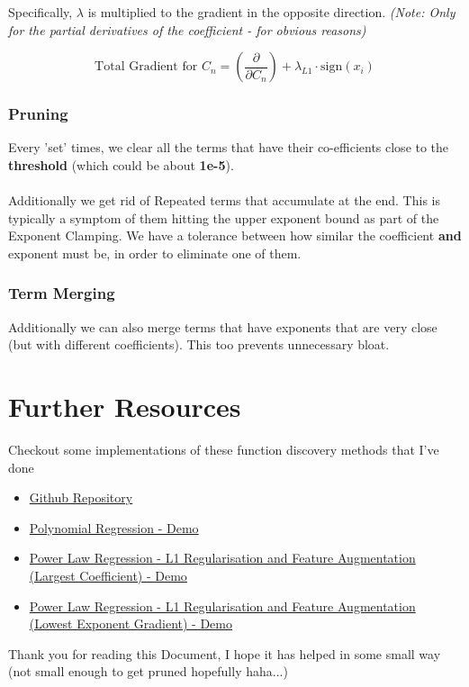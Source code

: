 \documentclass[11pt]{article}
\begin{document}
Specifically, \(\lambda\) is multiplied to the gradient in the opposite direction. \textit{(Note: Only for the partial derivatives of the coefficient - for obvious reasons)}

\[
\text{Total Gradient for } C_n  = \left( \frac{\partial}{\partial C_n} \right) + \lambda_{L1} \cdot \text{sign}(x_i)
\]

\subsubsection{Pruning}

Every 'set' times, we clear all the terms that have their co-efficients close to the \textbf{threshold} (which could be about \textbf{1e-5}). \\\\Additionally we get rid of Repeated terms that accumulate at the end. This is typically a symptom of them hitting the upper exponent bound as part of the Exponent Clamping. We have a tolerance between how similar the coefficient \textbf{and} exponent must be, in order to eliminate one of them.

\subsubsection{Term Merging}
Additionally we can also merge terms that have exponents that are very close (but with different coefficients). This too prevents unnecessary bloat.

\section{Further Resources}
Checkout some implementations of these function discovery methods that I've done
\begin{itemize}
    \item \href{https://github.com/GDSimpson3/Polynomial-regression-001-impl}{Github Repository}
    \item \href{https://www.youtube.com/watch?v=4GjD-u8gIzk}{Polynomial Regression - Demo}
    \item \href{https://www.youtube.com/watch?v=BXa3sEWsC-o}{Power Law Regression - L1 Regularisation and Feature Augmentation (Largest Coefficient) - Demo}
    \item \href{https://www.youtube.com/watch?v=yqDcuL6-ShA}{Power Law Regression - L1 Regularisation and Feature Augmentation (Lowest Exponent Gradient) - Demo}
\end{itemize}

Thank you for reading this Document, I hope it has helped in some small way (not small enough to get pruned hopefully haha...)
\end{document}
